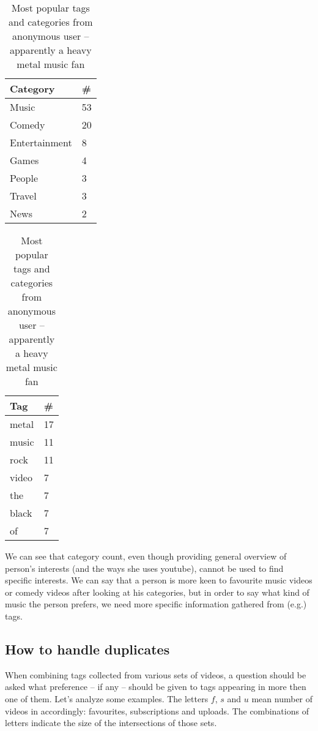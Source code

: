 \begin{table}
\begin{minipage}[b]{0.5\linewidth}\centering

\begin{tabular}{| l | l |}
Category & \# \\ \hline
Music & 53 \\
Comedy & 20 \\
Entertainment & 8 \\
Games & 4 \\
People & 3 \\
Travel & 3 \\
News & 2 \\
\end{tabular}

\end{minipage}
\hspace{0.5cm}
\begin{minipage}[b]{0.5\linewidth}
\centering

\begin{tabular}{| l | l |}
Tag & \# \\ \hline
metal & 17 \\
music & 11 \\
rock & 11 \\
video & 7 \\
the & 7 \\
black & 7 \\
of & 7 \\
\end{tabular}

\end{minipage}

\caption{Most popular tags and categories from anonymous user -- apparently a
heavy metal music fan}
\end{table}

We can see that category count, even though providing general overview of
person's interests (and the ways she uses youtube), cannot be used to find
specific interests. We can say that a person is more keen to
favourite music videos or comedy videos after looking at his categories, but in
order to say what kind of music the person prefers, we need more specific
information gathered from (e.g.) tags.

\subsection{How to handle duplicates}

When combining tags collected from various sets of videos, a question should be
asked what preference -- if any -- should be given to tags appearing in more
then one of them. Let's analyze some examples. The letters $f$, $s$ and $u$ mean number
of videos in accordingly: favourites, subscriptions and uploads. The
combinations of letters indicate the size of the intersections of those sets.

